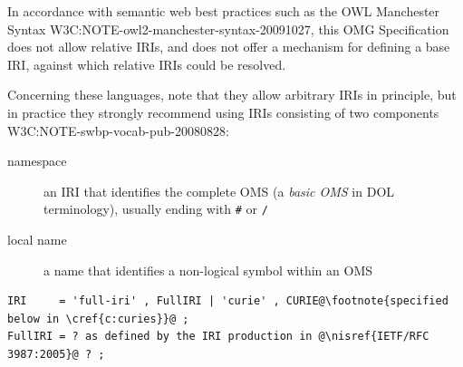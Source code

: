 \documentclass[10pt,%
\ifpretendfinal
final%
\else
draft%
\fi,
]{scrreprt}
\makeatletter
\newcommand*\CommentAuthor{}
\renewcommand*\CommentAuthor{#1}}
\newcommand*\CommentDate{}
\renewcommand*\CommentDate{#1}}
\newcommand*\CommentId{}
\renewcommand*\CommentId{#1}}
\newcommand*\CommentType{}
\renewcommand*\CommentType{#1}}
\newcommand*{\SetCommentColorByType}[1]{%
\edef\localType{{#1}}%
\expandafter\ifstrequal\localType{q-aut}{\colorlet{CommentColor}{red}}{%
\expandafter\ifstrequal\localType{q-all}{\colorlet{CommentColor}{orange}}{%
\expandafter\ifstrequal\localType{todo}{\colorlet{CommentColor}{orange}}{%
\expandafter\ifstrequal\localType{fyi}{\colorlet{CommentColor}{lightgray}}{%
\colorlet{CommentColor}{yellow}}}}}}
\newcommand*{\SetCommentPrefixByType}[1]{%
\edef\localType{{#1}}%
\expandafter\@ifmtarg\localType{%
\edef\CommentPrefix{}%
}{%
\caseupper[q]{#1}%
\edef\CommentPrefix{\thestring: }%
}}
\newcommand*{\initComment}[1]{%
\setkeys{Comment}{#1}%
\SetCommentColorByType{\CommentType}%
\relax%
\SetCommentPrefixByType{\CommentType}%
\relax%
}
\newcommand*{\todonote}[2][]{%
\initComment{#1}%
\pdfcomment[author=\CommentAuthor,color=CommentColor,date=\CommentDate,id=\CommentId]{%
\CommentPrefix
#2}}
\renewcommand*{\todonote}[2][]{%
\initComment{#1}%
\ednote{\CommentPrefix #2}}
\newcommand*{\syntax}[1]{\texttt{#1}}
\newcommand*{\IS}{OMG Specification\xspace}
\newcommand{\clauserefname}{clause}
\newcommand{\bref}[1]{[\ref{#1}]}
\newcommand{\cref}[1]{\clauserefname~\ref{#1}}
\newcommand{\nisref}[1]{#1}
\renewcommand{\bref}[1]{#1}
\makeatother
\begin{document}


In accordance with semantic web best practices such as the OWL Manchester Syntax \bref{W3C:NOTE-owl2-manchester-syntax-20091027}, this \IS does not allow relative IRIs, and does not offer a mechanism for defining a base IRI, against which relative IRIs could be resolved.

Concerning these languages, note that they allow arbitrary IRIs in principle, but in practice they strongly recommend using IRIs consisting of two components \bref{W3C:NOTE-swbp-vocab-pub-20080828}:
\begin{description}
\item[namespace] an IRI that identifies the complete OMS (a \emph{basic OMS} in DOL terminology), usually ending with \syntax{\#} or \syntax{/}
\item[local name] a name that identifies a non-logical symbol within an OMS
\end{description}

\begin{lstlisting}[language=ebnf,escapechar=@]
IRI     = 'full-iri' , FullIRI | 'curie' , CURIE@\footnote{specified below in \cref{c:curies}}@ ;
FullIRI = ? as defined by the IRI production in @\nisref{IETF/RFC 3987:2005}@ ? ;
\end{lstlisting}
\end{document}
